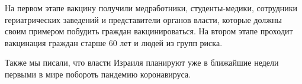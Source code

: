 На первом этапе вакцину получили медработники, студенты-медики, сотрудники
гериатрических заведений и представители органов власти, которые должны своим
примером побудить граждан вакцинироваться. На втором этапе проходит вакцинация
граждан старше 60 лет и людей из групп риска.

Также мы писали, что власти Израиля планируют уже в ближайшие недели первыми в
мире побороть пандемию коронавируса.
